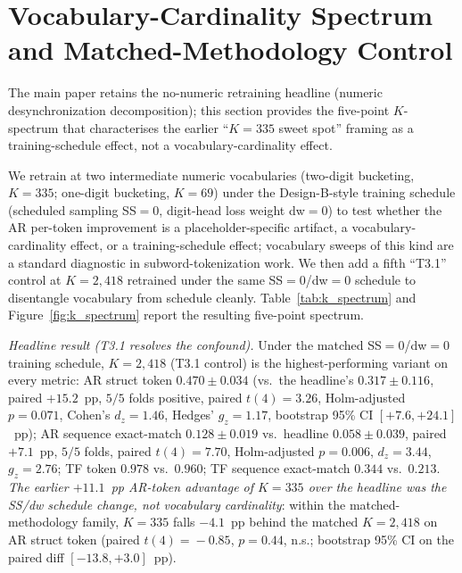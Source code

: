 \documentclass[11pt,a4paper]{article}
\begin{document}


\section{Vocabulary-Cardinality Spectrum and Matched-Methodology Control}
\label{sec:abl-nonumeric-supp}

The main paper retains the no-numeric retraining headline (numeric desynchronization
decomposition); this section provides the five-point $K$-spectrum that
characterises the earlier ``$K\!=\!335$ sweet spot'' framing as a
training-schedule effect, not a vocabulary-cardinality effect.

We retrain at two intermediate numeric vocabularies (two-digit bucketing,
$K\!=\!335$; one-digit bucketing, $K\!=\!69$) under the Design-B-style
training schedule (scheduled sampling SS$=$0, digit-head loss weight
dw$=$0) to test whether the AR per-token improvement is a
placeholder-specific artifact, a vocabulary-cardinality effect, or a
training-schedule effect; vocabulary sweeps of this kind are a standard
diagnostic in subword-tokenization work.
We then add a fifth ``T3.1'' control at $K\!=\!2{,}418$ retrained under
the same SS$=$0/dw$=$0 schedule to disentangle vocabulary from
schedule cleanly. Table~\ref{tab:k_spectrum} and
Figure~\ref{fig:k_spectrum} report the resulting five-point spectrum.

\emph{Headline result (T3.1 resolves the confound).} Under the matched
SS$=$0/dw$=$0 training schedule, $K\!=\!2{,}418$ (T3.1 control) is the
highest-performing variant on every metric: AR struct token
$0.470 \pm 0.034$ (vs.\ the headline's $0.317 \pm 0.116$, paired
$+15.2$~pp, $5/5$ folds positive, paired $t(4)\!=\!3.26$,
Holm-adjusted $p\!=\!0.071$, Cohen's $d_{z}\!=\!1.46$, Hedges'
$g_{z}\!=\!1.17$, bootstrap 95\% CI $[+7.6, +24.1]$~pp); AR sequence
exact-match $0.128 \pm 0.019$ vs.\ headline $0.058 \pm 0.039$, paired
$+7.1$~pp, $5/5$ folds, paired $t(4)\!=\!7.70$, Holm-adjusted
$p\!=\!0.006$, $d_{z}\!=\!3.44$, $g_{z}\!=\!2.76$; TF token $0.978$
vs.\ $0.960$; TF sequence exact-match $0.344$ vs.\ $0.213$. \emph{The
earlier $+11.1$~pp AR-token advantage of $K\!=\!335$ over the
headline was the SS/dw schedule change, not vocabulary cardinality}:
within the matched-methodology family, $K\!=\!335$ falls $-4.1$~pp
behind the matched $K\!=\!2{,}418$ on AR struct token (paired
$t(4)\!=\!-0.85$, $p\!=\!0.44$, n.s.; bootstrap 95\% CI on the paired
diff $[-13.8, +3.0]$~pp).
\end{document}
